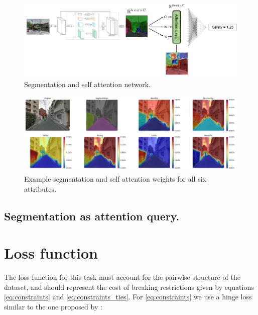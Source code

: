 \begin{figure}[ht]
	\begin{center}
	\includegraphics[width=1\textwidth]{./figures/self_attn.png}
	\caption[Self Attention network]{Segmentation and self attention network.}
	\label{fig:segrank_1}
	\end{center}
\end{figure}

\begin{figure}[ht]
	\begin{center}
	\includegraphics[width=1\textwidth]{./figures/self_attn_vis.png}
	\caption[Self Attention Model output]{Example segmentation and self attention weights for all six attributes.}
	\label{fig:segrank_1}
	\end{center}
\end{figure}



\subsection{Segmentation as attention query.}

\section{Loss function} \label{section:loss}
The loss function for this task must account for the pairwise structure of the dataset,
and should represent the cost of breaking restrictions given by equations
\ref{eq:constraints} and \ref{eq:constraints_ties}. For \ref{eq:constraints} we use
a hinge loss similar to the one proposed by :

